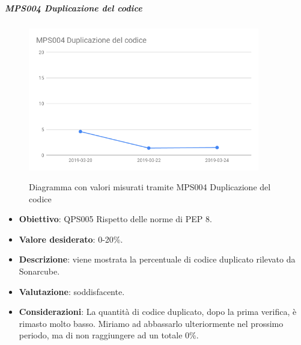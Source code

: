     \subparagraph{MPS004 Duplicazione del codice}
    
    \begin{figure}[H]
        \centering
        \includegraphics[width=0.9\textwidth]{img/cruscotti/MPS004.png}
        \label{immaginePresenzaDupplicazioneCodice}
        \caption{Diagramma con valori misurati tramite MPS004 Duplicazione del codice}
    \end{figure}
    
    \begin{itemize}
        \item \textbf{Obiettivo}: QPS005 Rispetto delle norme di PEP 8.
        \item \textbf{Valore desiderato}: 0-20\%.
        \item \textbf{Descrizione}: viene mostrata la percentuale di codice duplicato rilevato da Sonarcube.
        \item \textbf{Valutazione}: soddisfacente.
        \item \textbf{Considerazioni}: La quantità di codice duplicato, dopo la prima verifica, è rimasto molto basso. Miriamo ad abbassarlo ulteriormente nel prossimo periodo, ma di non raggiungere ad un totale 0\%.
    \end{itemize}